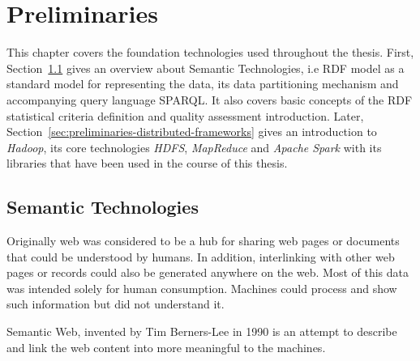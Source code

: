 \chapter{Preliminaries}
\label{chapter:preliminaries}
This chapter covers the foundation technologies used throughout the thesis.
First, Section~\ref{sec:preliminaries-semantic-technologies} gives an overview about Semantic Technologies, i.e \gls{RDF} model as a standard model for representing the data, its data partitioning mechanism and accompanying query language \gls{SPARQL}.
It also covers basic concepts of the \gls{RDF} statistical criteria definition and quality assessment introduction. 
Later, Section~\ref{sec:preliminaries-distributed-frameworks} gives an introduction to \textit{Hadoop}, its core technologies \textit{\gls{HDFS}}, \textit{MapReduce} and \textit{Apache Spark} with its libraries that have been used in the course of this thesis.

\section{Semantic Technologies}
\label{sec:preliminaries-semantic-technologies}
Originally web was considered to be a hub for sharing web pages or documents that could be understood by humans.
In addition, interlinking with other web pages or records could also be generated anywhere on the web. 
Most of this data was intended solely for human consumption.
Machines could process and show such information but did not understand it.

Semantic Web, invented by Tim Berners-Lee in 1990 is an attempt to describe and link the web content into more meaningful to the machines.





